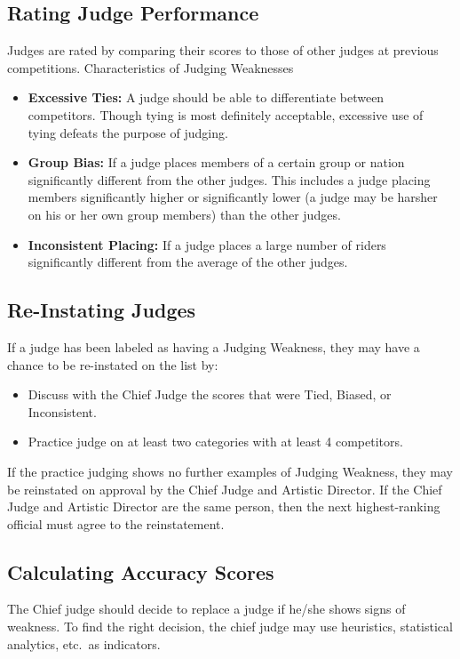 \subsection{Rating Judge Performance \label{subsec:freestyle_judging-panel_rating-judge-performance}} %
Judges are rated by comparing their scores to those of other judges at previous competitions.
Characteristics of Judging Weaknesses
\begin{itemize}
\item \textbf{Excessive Ties:} A judge should be able to differentiate between competitors.
Though tying is most definitely acceptable, excessive use of tying defeats the purpose of judging.
\item \textbf{Group Bias:} If a judge places members of a certain group or nation significantly different from the other judges.
This includes a judge placing members significantly higher or significantly lower (a judge may be harsher on his or her own group members) than the other judges.
\item \textbf{Inconsistent Placing:} If a judge places a large number of riders significantly different from the average of the other judges.
\end{itemize}

\subsection{Re-Instating Judges} %
If a judge has been labeled as having a Judging Weakness, they may have a chance to be re-instated on the list by:
\begin{itemize} 
\item Discuss with the Chief Judge the scores that were Tied, Biased, or Inconsistent.
\item Practice judge on at least two categories with at least 4 competitors.
\end{itemize}
If the practice judging shows no further examples of Judging Weakness, they may be reinstated on approval by the Chief Judge and Artistic Director.
If the Chief Judge and Artistic Director are the same person, then the next highest-ranking official must agree to the reinstatement.

\subsection{Calculating Accuracy Scores \label{subsec:freestyle_judging-panel_calculating-accuracy-scores}} %
The Chief judge should decide to replace a judge if he/she shows signs of weakness.
To find the right decision, the chief judge may use heuristics, statistical analytics, etc.\ as indicators.


